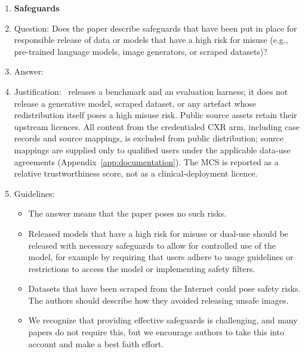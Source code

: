 \begin{enumerate}
\begin{itemize}
        \item The authors should consider possible harms that could arise when the technology is being used as intended and functioning correctly, harms that could arise when the technology is being used as intended but gives incorrect results, and harms following from (intentional or unintentional) misuse of the technology.
        \item If there are negative societal impacts, the authors could also discuss possible mitigation strategies (e.g., gated release of models, providing defenses in addition to attacks, mechanisms for monitoring misuse, mechanisms to monitor how a system learns from feedback over time, improving the efficiency and accessibility of ML).
    \end{itemize}

\item {\bf Safeguards}
    \item[] Question: Does the paper describe safeguards that have been put in place for responsible release of data or models that have a high risk for misuse (e.g., pre-trained language models, image generators, or scraped datasets)?
    \item[] Answer: \answerNA{}
    \item[] Justification: \medvigil\ releases a benchmark and an evaluation harness; it does not release a generative model, scraped dataset, or any artefact whose redistribution itself poses a high misuse risk. Public source assets retain their upstream licences. All content from the credentialed CXR arm, including case records and source mappings, is excluded from public distribution; source mappings are supplied only to qualified users under the applicable data-use agreements (Appendix~\ref{app:documentation}). The MCS is reported as a relative trustworthiness score, not as a clinical-deployment licence.
    \item[] Guidelines:
    \begin{itemize}
        \item The answer \answerNA{} means that the paper poses no such risks.
        \item Released models that have a high risk for misuse or dual-use should be released with necessary safeguards to allow for controlled use of the model, for example by requiring that users adhere to usage guidelines or restrictions to access the model or implementing safety filters.
        \item Datasets that have been scraped from the Internet could pose safety risks. The authors should describe how they avoided releasing unsafe images.
        \item We recognize that providing effective safeguards is challenging, and many papers do not require this, but we encourage authors to take this into account and make a best faith effort.
    \end{itemize}


\end{enumerate}
